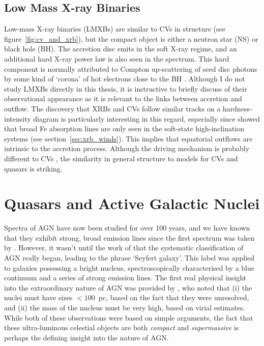 \subsection{Low Mass X-ray Binaries}

Low-mass X-ray binaries (LMXBs) 
are similar to CVs in structure (see figure~\ref{fig:cv_and_xrb}), 
but the compact object
is either a neutron star (NS) or black hole (BH). The accretion disc 
emits in the soft X-ray regime, and an additional hard X-ray power law is also 
seen in the spectrum. This hard component is normally attributed
to Compton up-scattering of seed disc photons by some kind of `corona'
of hot electrons close to the BH \citep[e.g.][]{white1988,mitsuda1989,uttley2014}.
Although I do not study LMXBs directly in this thesis, it is instructive
to briefly discuss of their observational appearance as it is relevant to the links
between accretion and outflow. The discovery that XRBs and CVs follow similar 
tracks on a hardness-intensity diagram \citep{kordingDNjet2008}
is particularly interesting in this regard, especially since \cite{ponti2012}
showed that broad Fe absorption lines are only seen in the soft-state 
high-inclination systems (see section~\ref{sec:xrb_winds}). 
This implies that equatorial outflows are intrinsic to 
the accretion process. Although the driving mechanism
is probably different to CVs \citep[e.g.][]{diaztrigo2015}, 
the similarity in general structure to models for CVs and quasars is striking.




\section{Quasars and Active Galactic Nuclei}

Spectra of AGN have now been studied for over 100 years, and we have known 
that they exhibit strong, broad emission lines since the first spectrum was taken by
\cite{fath1909}. However, it wasn't until the work of \cite{seyfert1943} that the systematic 
classification of AGN really began, leading to the phrase `Seyfert galaxy'.
This label was applied to galaxies possessing a bright nucleus, spectroscopically
characterised by a blue continuum and a series of strong emission lines.
The first real physical insight into the extraordinary nature of AGN
was provided by \cite{woltjer1959}, who noted that 
(i) the nuclei must have sizes $<100$~pc,
based on the fact that they were unresolved, and (ii) the mass of the nucleus
must be very high, based on virial estimates. 
While both of these observations were based on simple arguments, the fact that these
ultra-luminous celestial objects are both {\em compact} and {\em supermassive}
is perhaps the defining insight into the nature of AGN.

